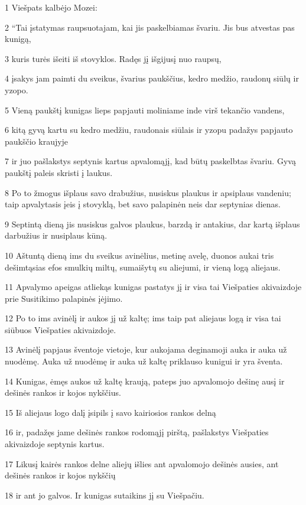 \par 1 Viešpats kalbėjo Mozei: 
\par 2 “Tai įstatymas raupsuotajam, kai jis paskelbiamas švariu. Jis bus atvestas pas kunigą, 
\par 3 kuris turės išeiti iš stovyklos. Radęs jį išgijusį nuo raupsų, 
\par 4 įsakys jam paimti du sveikus, švarius paukščius, kedro medžio, raudonų siūlų ir yzopo. 
\par 5 Vieną paukštį kunigas lieps papjauti moliniame inde virš tekančio vandens, 
\par 6 kitą gyvą kartu su kedro medžiu, raudonais siūlais ir yzopu padažys papjauto paukščio kraujyje 
\par 7 ir juo pašlakstys septynis kartus apvalomąjį, kad būtų paskelbtas švariu. Gyvą paukštį paleis skristi į laukus. 
\par 8 Po to žmogus išplaus savo drabužius, nusiskus plaukus ir apsiplaus vandeniu; taip apvalytasis įeis į stovyklą, bet savo palapinėn neis dar septynias dienas. 
\par 9 Septintą dieną jis nusiskus galvos plaukus, barzdą ir antakius, dar kartą išplaus darbužius ir nusiplaus kūną. 
\par 10 Aštuntą dieną ims du sveikus avinėlius, metinę avelę, duonos aukai tris dešimtąsias efos smulkių miltų, sumaišytų su aliejumi, ir vieną logą aliejaus. 
\par 11 Apvalymo apeigas atliekąs kunigas pastatys jį ir visa tai Viešpaties akivaizdoje prie Susitikimo palapinės įėjimo. 
\par 12 Po to ims avinėlį ir aukos jį už kaltę; ims taip pat aliejaus logą ir visa tai siūbuos Viešpaties akivaizdoje. 
\par 13 Avinėlį papjaus šventoje vietoje, kur aukojama deginamoji auka ir auka už nuodėmę. Auka už nuodėmę ir auka už kaltę priklauso kunigui ir yra šventa. 
\par 14 Kunigas, ėmęs aukos už kaltę kraują, pateps juo apvalomojo dešinę ausį ir dešinės rankos ir kojos nykščius. 
\par 15 Iš aliejaus logo dalį įsipils į savo kairiosios rankos delną 
\par 16 ir, padažęs jame dešinės rankos rodomąjį pirštą, pašlakstys Viešpaties akivaizdoje septynis kartus. 
\par 17 Likusį kairės rankos delne aliejų išlies ant apvalomojo dešinės ausies, ant dešinės rankos ir kojos nykščių 
\par 18 ir ant jo galvos. Ir kunigas sutaikins jį su Viešpačiu. 
